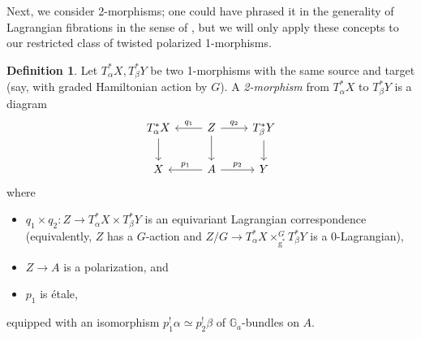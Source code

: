 \documentclass[11pt, a4paper]{amsart}
\numberwithin{equation}{section}
\theoremstyle{definition}
\newtheorem{definition}[theorem]{Definition}
\theoremstyle{remark}
\newcommand{\g}{\mathrm{g}}
\newcommand{\GG}{\mathbb{G}}
\renewcommand{\to}{\longrightarrow}
\begin{document}
Next, we consider 2-morphisms; one could have phrased it in the generality of Lagrangian fibrations in the sense of \cite{Safronov}, but we will only apply these concepts to our restricted class of twisted polarized 1-morphisms. 
\begin{definition} \label{defn 2-morphism}
    Let $T^*_\alpha X, T^*_\beta Y$ be two 1-morphisms with the same source and target (say, with graded Hamiltonian action by $G$). A \textit{2-morphism} from $T^*_\alpha X$ to $T^*_\beta Y$ is a diagram
    \begin{equation}
        \begin{tikzcd}
	{T^*_\alpha X} & Z & {T^*_\beta Y} \\
	X & A & Y
	\arrow[from=1-1, to=2-1]
	\arrow["{q_1}"', from=1-2, to=1-1]
	\arrow["{q_2}", from=1-2, to=1-3]
	\arrow[from=1-2, to=2-2]
	\arrow[from=1-3, to=2-3]
	\arrow["{p_1}"', from=2-2, to=2-1]
	\arrow["{p_2}", from=2-2, to=2-3]
\end{tikzcd}
    \end{equation}
    where
    \begin{itemize}
        \item $q_1 \times q_2: Z \to T^*_\alpha X \times T^*_\beta Y$ is an equivariant Lagrangian correspondence (equivalently, $Z$ has a $G$-action and $Z/G \to T^*_\alpha X \times_{\g^*}^G T^*_\beta Y$ is a 0-Lagrangian),
        \item $Z \to A$ is a polarization, and
        \item $p_1$ is \'etale, 
    \end{itemize}
    equipped with an isomorphism $p_1^!\alpha \simeq p_2^!\beta$ of $\GG_a$-bundles on $A$.


\end{definition}
\end{document}
